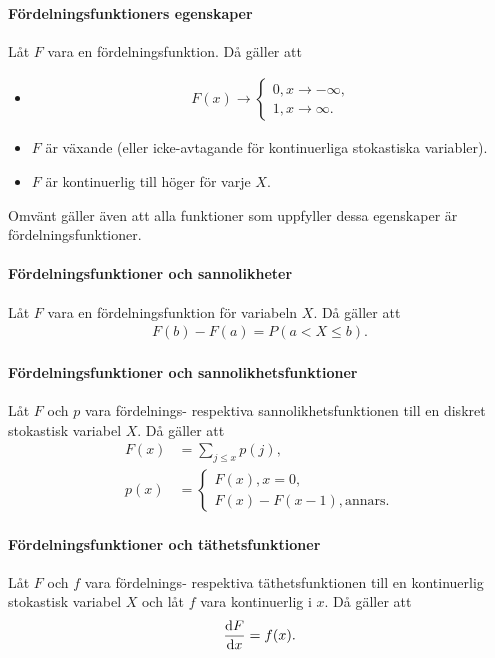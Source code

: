 \paragraph{Fördelningsfunktioners egenskaper}
Låt $F$ vara en fördelningsfunktion. Då gäller att
\begin{itemize}
	\item
	\begin{align*}
		F(x)\to
		\begin{cases}
			0, x\to -\infty, \\
			1, x\to\infty.
		\end{cases}
	\end{align*}
	\item $F$ är växande (eller icke-avtagande för kontinuerliga stokastiska variabler).
	\item $F$ är kontinuerlig till höger för varje $X$.
\end{itemize}
Omvänt gäller även att alla funktioner som uppfyller dessa egenskaper är fördelningsfunktioner.

\proof

\paragraph{Fördelningsfunktioner och sannolikheter}
Låt $F$ vara en fördelningsfunktion för variabeln $X$. Då gäller att
\begin{align*}
	F(b) - F(a) = P(a < X\leq b).
\end{align*}

\proof

\paragraph{Fördelningsfunktioner och sannolikhetsfunktioner}
Låt $F$ och $p$ vara fördelnings- respektiva sannolikhetsfunktionen till en diskret stokastisk variabel $X$. Då gäller att
\begin{align*}
	F(x) &= \sum\limits_{j\leq x}p(j), \\
	p(x) &=
	\begin{cases}
		F(x), x = 0, \\
		F(x) - F(x - 1), \text{annars}.
	\end{cases}
\end{align*}

\proof

\paragraph{Fördelningsfunktioner och täthetsfunktioner}
Låt $F$ och $f$ vara fördelnings- respektiva täthetsfunktionen till en kontinuerlig stokastisk variabel $X$ och låt $f$ vara kontinuerlig i $x$. Då gäller att
\begin{align*}
	\dv{F}{x} (x) = f(x).
\end{align*}

